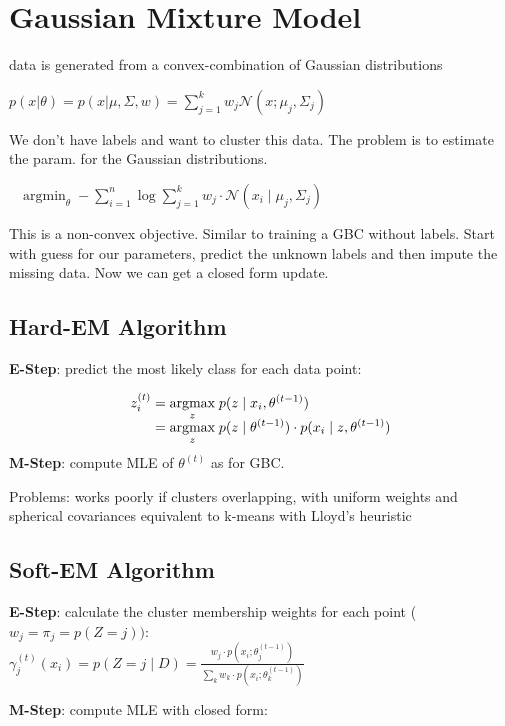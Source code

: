\section*{Gaussian Mixture Model}

data is generated from a convex-combination of Gaussian distributions

$p(x  | \theta) = p(x  | \mu, \Sigma, w) = \sum_{j=1}^k w_j \mathcal{N}(x; \mu_j, \Sigma_j)$

We don't have labels and want to cluster this data. The problem is to estimate the param. for the Gaussian distributions.

\ \ $\text{argmin}_{\theta} \; - \sum_{i=1}^n \log \sum_{j=1}^k w_j \cdot \mathcal{N}(x_i \; | \; \mu_j, \Sigma_j)$

This is a non-convex objective. Similar to training a GBC without labels. Start with guess for our parameters, predict the unknown labels and then impute the missing data. Now we can get a closed form update.

\subsection*{Hard-EM Algorithm}

\textbf{E-Step}: predict the most likely class for each data point:

\begin{align*}
	z_i^{(t)} &= \underset{z}{\text{argmax}} \; p(z \; | \; x_i, \theta^{(t-1)}) \\[-5pt]
	&= \underset{z}{\text{argmax}} \; p(z \; | \; \theta^{(t-1)}) \cdot p(x_i \; | \; z, \theta^{(t-1)})
\end{align*}
\textbf{M-Step}: compute MLE of $\theta^{(t)}$ as for GBC. \smallskip

Problems: works poorly if clusters overlapping, with uniform weights and spherical covariances equivalent to k-means with Lloyd's heuristic

\subsection*{Soft-EM Algorithm}

\textbf{E-Step}: calculate the cluster membership weights for each point ($w_j = \pi_j = p(Z = j))$: \\[-8pt]

\quad $\gamma_j^{(t)}(x_i) = p(Z = j \; | \; D) =\frac{w_j \cdot p(x_i ; \theta_j^{(t-1)})}{\sum_k w_k \cdot p(x_i ; \theta_k^{(t-1)})}$
		
\textbf{M-Step}: compute MLE with closed form:

